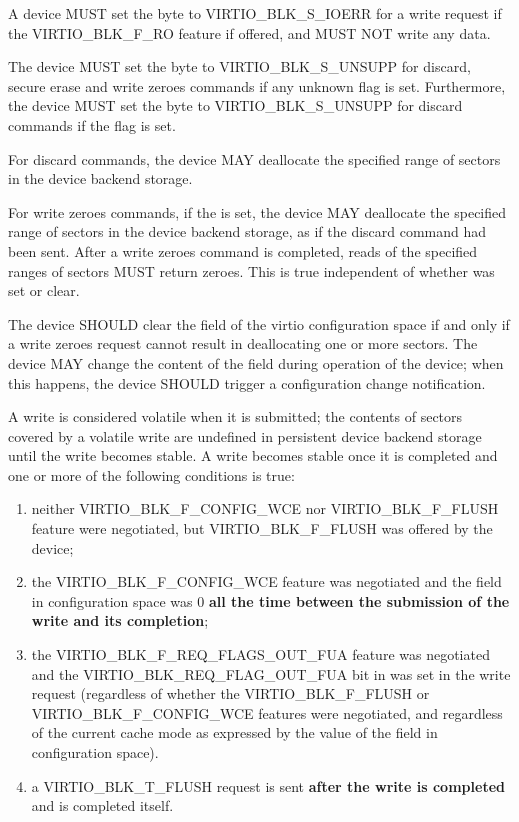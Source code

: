A device MUST set the  byte to VIRTIO_BLK_S_IOERR
for a write request if the VIRTIO_BLK_F_RO feature if offered, and MUST NOT
write any data.

The device MUST set the  byte to VIRTIO_BLK_S_UNSUPP for
discard, secure erase and write zeroes commands if any unknown flag is set.
Furthermore, the device MUST set the  byte to
VIRTIO_BLK_S_UNSUPP for discard commands if the  flag is set.

For discard commands, the device MAY deallocate the specified range of
sectors in the device backend storage.

For write zeroes commands, if the  is set, the device MAY
deallocate the specified range of sectors in the device backend storage,
as if the discard command had been sent.  After a write zeroes command
is completed, reads of the specified ranges of sectors MUST return
zeroes.  This is true independent of whether  was set or clear.

The device SHOULD clear the  field of the
virtio configuration space if and only if a write zeroes request cannot
result in deallocating one or more sectors.  The device MAY change the
content of the field during operation of the device; when this happens,
the device SHOULD trigger a configuration change notification.

A write is considered volatile when it is submitted; the contents of
sectors covered by a volatile write are undefined in persistent device
backend storage until the write becomes stable.  A write becomes stable
once it is completed and one or more of the following conditions is true:

\begin{enumerate}
\item\label{item:flush1} neither VIRTIO_BLK_F_CONFIG_WCE nor
  VIRTIO_BLK_F_FLUSH feature were negotiated, but VIRTIO_BLK_F_FLUSH was
  offered by the device;

\item\label{item:flush2} the VIRTIO_BLK_F_CONFIG_WCE feature was negotiated and the
   field in configuration space was 0 \textbf{all the time between
  the submission of the write and its completion};

\item\label{item:flush3} the VIRTIO_BLK_F_REQ_FLAGS_OUT_FUA feature was
  negotiated and the VIRTIO_BLK_REQ_FLAG_OUT_FUA bit in  was set in
  the write request (regardless of whether the VIRTIO_BLK_F_FLUSH or
  VIRTIO_BLK_F_CONFIG_WCE features were negotiated, and regardless of the
  current cache mode as expressed by the value of the  field in
  configuration space).

\item\label{item:flush4} a VIRTIO_BLK_T_FLUSH request is sent \textbf{after the write is
  completed} and is completed itself.
\end{enumerate}

